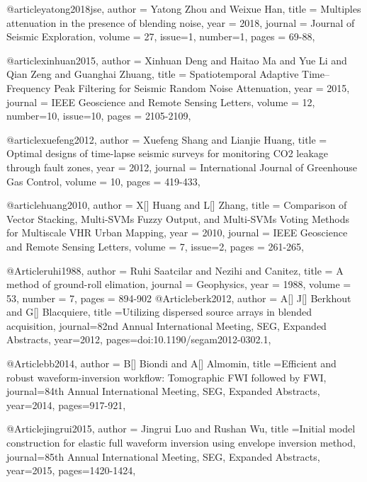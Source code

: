 @article{yatong2018jse,
  author =	 {Yatong Zhou and Weixue Han},
  title =	 {Multiples attenuation in the presence of blending noise},
  year =	 2018,
  journal =	 {Journal of Seismic Exploration},
  volume =	 27,
  issue=1,
  number=1,
  pages =	 {69-88},
}



@article{xinhuan2015,
  author =	 {Xinhuan Deng and Haitao Ma and Yue Li and Qian Zeng and Guanghai Zhuang},
  title =	 {Spatiotemporal Adaptive Time–Frequency Peak Filtering for Seismic Random Noise Attenuation},
  year =	 2015,
  journal =	 {IEEE Geoscience and Remote Sensing Letters},
  volume =	 12,
  number=10,
  issue=10,
  pages =	 {2105-2109},
}

@article{xuefeng2012,
  author =	 {Xuefeng Shang and Lianjie Huang},
  title =	 {Optimal designs of time-lapse seismic surveys for monitoring CO2 leakage
through fault zones},
  year =	 2012,
  journal =	 {International Journal of Greenhouse Gas Control},
  volume =	 10,
  pages =	 {419-433},
}


@article{huang2010,
  author =	 {X[] Huang and L[] Zhang},
  title =	 {Comparison of Vector Stacking, Multi-SVMs Fuzzy Output, and Multi-SVMs Voting Methods for Multiscale VHR Urban Mapping},
  year =	 2010,
  journal =	 {IEEE Geoscience and Remote Sensing Letters},
  volume =	 7,
  issue=2,
  pages =	 {261-265},
}


@Article{ruhi1988,
  author = 	 {Ruhi Saatcilar and Nezihi and Canitez},
  title = 	 {A method of ground-roll elimation},
  journal = 	 {Geophysics},
  year = 	 1988,
  volume = 	 53,
  number = 	 7,
  pages = 	 {894-902}}
@Article{berk2012,
  author = {A[] J[] Berkhout and G[] Blacquiere},
  title ={Utilizing dispersed source arrays in blended acquisition},
  journal={82nd Annual International Meeting, SEG, Expanded Abstracts},
  year=2012,
  pages={doi:10.1190/segam2012-0302.1},
}



@Article{bb2014,
  author = {B[] Biondi and A[] Almomin},
  title ={Efficient and robust waveform-inversion workflow: Tomographic FWI followed by FWI},
  journal={84th Annual International Meeting, SEG, Expanded Abstracts},
  year=2014,
  pages={917-921},
}

@Article{jingrui2015,
  author = {Jingrui Luo and Rushan Wu},
  title ={Initial model construction for elastic full waveform inversion using envelope inversion method},
  journal={85th Annual International Meeting, SEG, Expanded Abstracts},
  year=2015,
  pages={1420-1424},
}

